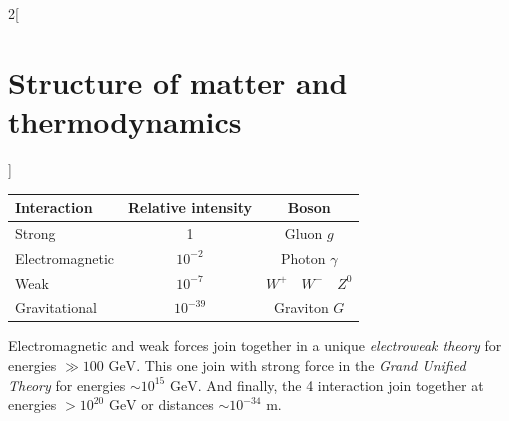 \documentclass[../../../main.tex]{subfiles}
\begin{document}
\begin{multicols}{2}[\section{Structure of matter and thermodynamics}]
\begin{definition}
        \begin{center}
            \begin{minipage}{\linewidth}
                \centering
                \begin{tabular}{lcc}
                    \hline
                    \hline
                    Interaction     & Relative intensity & Boson                   \\
                    \hline
                    Strong          & 1                  & Gluon $g$               \\
                    Electromagnetic & $10^{-2}$          & Photon $\gamma$         \\
                    Weak            & $10^{-7}$          & $W^+\quad W^-\quad Z^0$ \\
                    Gravitational   & $10^{-39}$         & Graviton $G$            \\
                    \hline
                    \hline
                \end{tabular}
            \end{minipage}
        \end{center}
    \end{definition}
    \begin{definition}
        Electromagnetic and weak forces join together in a unique \textit{electroweak theory} for energies $\gg 100\text{ GeV}$. This one join with strong force in the \textit{Grand Unified Theory} for energies $\sim 10^{15}\text{ GeV}$. And finally, the 4 interaction join together at energies $>10^{20}\text{ GeV}$ or distances $\sim 10^{-34}\text{ m}$.
    \end{definition}

\end{multicols}
\end{document}
